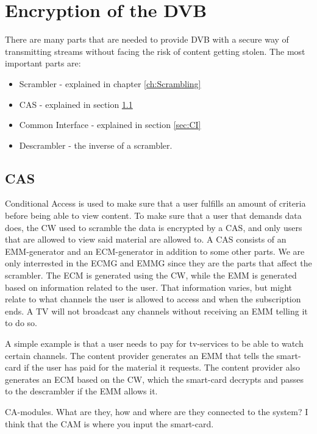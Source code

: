 \chapter{Encryption of the DVB}
There are many parts that are needed to provide DVB with a secure way of 
transmitting streams without facing the risk of content getting stolen. The 
most important parts are:

\begin{itemize}
\item Scrambler - explained in chapter \ref{ch:Scrambling}
\item CAS - explained in section \ref{sec:CAS}
\item Common Interface - explained in section \ref{sec:CI}
\item Descrambler - the inverse of a scrambler.
\end{itemize}

\section{CAS} \label{sec:CAS}
Conditional Access is used to make sure that a user fulfills an amount of 
criteria before being able to view content. To make sure that a user that 
demands data does, the CW used to scramble the data is encrypted by a CAS, and 
only users that are allowed to view said material are allowed to. A CAS consists 
of an EMM-generator and an ECM-generator in addition to some other parts. We are 
only interrested in the ECMG and EMMG since they are the parts that affect the 
scrambler. The ECM is generated using the CW, while the EMM is generated based 
on information related to the user. That information varies, but might relate to 
what channels the user is allowed to access and when the subscription ends. A TV 
will not broadcast any channels without receiving an EMM telling it to do so.

A simple example is that a user needs to pay for tv-services to be able to 
watch certain channels. The content provider generates an EMM that tells the 
smart-card if the user has paid for the material it requests. The content 
provider also generates an ECM based on the CW, which the smart-card decrypts 
and passes to the descrambler if the EMM allows it. 

CA-modules. What are they, how and where are they connected to the system? I 
think that the CAM is where you input the smart-card. 

